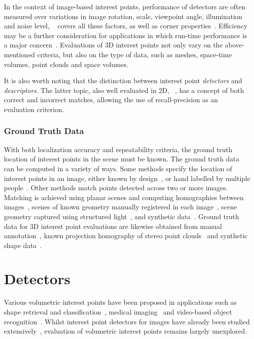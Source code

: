 In the context of image-based interest points, performance of detectors are often measured over variations in image rotation, scale, viewpoint angle, illumination and noise level, \eg~\cite{Schmid2000} covers all these factors, as well as corner properties~\cite{Rajan1989}. Efficiency may be a further consideration for applications in which run-time performance is a major concern~\cite{Rosten2010}. Evaluations of 3D interest points not only vary on the above-mentioned criteria, but also on the type of data, such as meshes, space-time volumes, point clouds and space volumes.

It is also worth noting that the distinction between interest point \emph{detectors} and \emph{descriptors}. The latter topic, also well evaluated in 2D, \eg~\cite{Mikolajczyk2005}, has a concept of both correct and incorrect matches, allowing the use of recall-precision as an evaluation criterion.

\subsubsection{Ground Truth Data}
With both localization accuracy and repeatability criteria, the ground truth location of interest points in the scene must be known. The ground truth data can be computed in a variety of ways. Some methods specify the location of interest points in an image, either known by design~\cite{Rajan1989}, or hand labelled by multiple people~\cite{Heath1997}. Other methods match points detected across two or more images. Matching is achieved using planar scenes and computing homographies between images~\cite{Schmid2000}, scenes of known geometry manually registered in each image~\cite{Rosten2010}, scene geometry captured using structured light~\cite{Aanaes2012}, and synthetic data~\cite{Laptev2005}. Ground truth data for 3D interest point evaluations are likewise obtained from manual annotation~\cite{Dutagaci2011}, known projection homography of stereo point clouds~\cite{Aanaes2012} and synthetic shape data~\cite{Salti2011}. 

\section{Detectors}
\label{sec:detectors}

Various volumetric interest points have been proposed in applications such as shape retrieval and classification~\cite{Riemenschneider2009,Flitton2010,Knopp2010,Prasad2011}, medical imaging~\cite{Criminisi2011,Ni2008,Donner2011} and video-based object recognition~\cite{Willems2009,Laptev2005,Yu2010}. Whilst interest point detectors for images have already been studied extensively~\cite{Mikolajczyk2005}, evaluation of volumetric interest points remains largely unexplored. 

